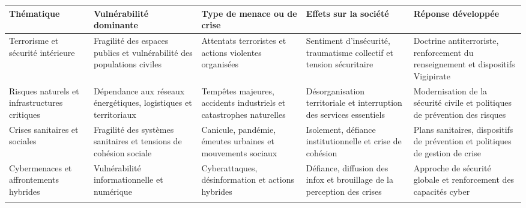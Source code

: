 \documentclass[12pt,a4paper]{article}
\begin{document}
\begin{table}[H]
\centering
\StyledTableSetup

\xdef\noteVulnerabilitesTerrorisme{\number\value{footnote}}
\xdef\noteVulnerabilitesRisquesNaturels{\number\value{footnote}}
\xdef\noteVulnerabilitesCrisesSanitaires{\number\value{footnote}}
\xdef\noteVulnerabilitesInterdependances{\number\value{footnote}}

\begin{tabularx}{\linewidth}{@{}
p{2.8cm}
Y
Y
Y
Y
@{}}

\toprule
\textbf{Thématique} &
\textbf{Vulnérabilité dominante} &
\textbf{Type de menace ou de crise} &
\textbf{Effets sur la société} &
\textbf{Réponse développée} \\
\midrule

Terrorisme et sécurité intérieure\footnotemark[\noteVulnerabilitesTerrorisme] &
Fragilité des espaces publics et vulnérabilité des populations civiles &
Attentats terroristes et actions violentes organisées &
Sentiment d'insécurité, traumatisme collectif et tension sécuritaire &
Doctrine antiterroriste, renforcement du renseignement et dispositifs Vigipirate \\
\addlinespace

Risques naturels et infrastructures critiques\footnotemark[\noteVulnerabilitesRisquesNaturels] &
Dépendance aux réseaux énergétiques, logistiques et territoriaux &
Tempêtes majeures, accidents industriels et catastrophes naturelles &
Désorganisation territoriale et interruption des services essentiels &
Modernisation de la sécurité civile et politiques de prévention des risques \\
\addlinespace

Crises sanitaires et sociales\footnotemark[\noteVulnerabilitesCrisesSanitaires] &
Fragilité des systèmes sanitaires et tensions de cohésion sociale &
Canicule, pandémie, émeutes urbaines et mouvements sociaux &
Isolement, défiance institutionnelle et crise de cohésion &
Plans sanitaires, dispositifs de prévention et politiques de gestion de crise \\
\addlinespace

Cybermenaces et affrontements hybrides &
Vulnérabilité informationnelle et numérique &
Cyberattaques, désinformation et actions hybrides &
Défiance, diffusion des infox et brouillage de la perception des crises &
Approche de sécurité globale et renforcement des capacités cyber \\
\addlinespace


\end{tabularx}
\end{table}
\end{document}
